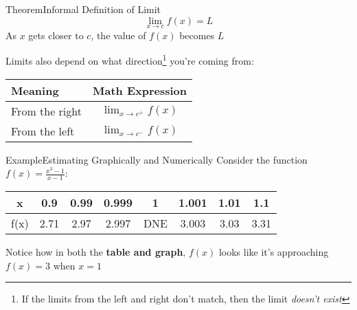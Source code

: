 \documentclass{MathNotes}
\newenvironment{example}[1]{\begin{BlueBox}{Example}{#1}}{\end{BlueBox}}
\newenvironment{theorem}[1]{\begin{GrayBox}{Theorem}{#1}}{\end{GrayBox}}
\begin{document}
\begin{multicols}{2}[]
	\begin{theorem}{Informal Definition of Limit}
		\[\lim_{x\to c}f(x)=L\]
		As $x$ gets closer to $c$, the value of $f(x)$ becomes $L$
	\end{theorem}


	Limits also depend on what direction\footnote{If the limits from the left and
		right don't match, then the limit \textit{doesn't exist}} you're coming from:
	\begin{tabular}{ |l|c| }
		\hline
		Meaning        & Math Expression       \\
		\hline
		\hline
		From the right & $\lim_{x\to c^+}f(x)$ \\
		\hline
		From the left  & $\lim_{x\to c^-}f(x)$ \\
		\hline
	\end{tabular}
\end{multicols}

\begin{example}{Estimating Graphically and Numerically}\label{ex:1.1}
	Consider the function $f(x)=\frac{x^3-1}{x-1}$:
	\begin{center}

		\begin{tabular}{ |c||c|c|c|c|c|c|c| }
			\hline
			x    & 0.9  & 0.99 & 0.999 & 1   & 1.001 & 1.01 & 1.1  \\
			\hline
			f(x) & 2.71 & 2.97 & 2.997 & DNE & 3.003 & 3.03 & 3.31 \\
			\hline
		\end{tabular}
	\end{center}

	Notice how in both the \textbf{table and graph}, $f(x)$ looks like it's
	approaching $f(x)=3$ when $x=1$
\end{example}
\end{document}
